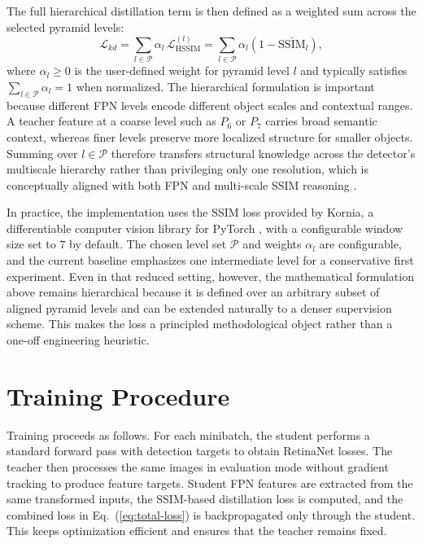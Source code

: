 The full hierarchical distillation term is then defined as a weighted sum across the selected pyramid levels:
\begin{equation}
\mathcal{L}_{kd} = \sum_{l \in \mathcal{P}} \alpha_l \, \mathcal{L}_{\mathrm{HSSIM}}^{(l)}
= \sum_{l \in \mathcal{P}} \alpha_l \left(1-\bar{\mathrm{SSIM}}_l\right),
\end{equation}
where $\alpha_l \ge 0$ is the user-defined weight for pyramid level $l$ and typically satisfies $\sum_{l \in \mathcal{P}} \alpha_l = 1$ when normalized. The hierarchical formulation is important because different FPN levels encode different object scales and contextual ranges. A teacher feature at a coarse level such as $P_6$ or $P_7$ carries broad semantic context, whereas finer levels preserve more localized structure for smaller objects. Summing over $l \in \mathcal{P}$ therefore transfers structural knowledge across the detector's multiscale hierarchy rather than privileging only one resolution, which is conceptually aligned with both FPN and multi-scale SSIM reasoning \cite{lin2017fpn,wang2003msssim,derijk2022structural}.

In practice, the implementation uses the SSIM loss provided by Kornia, a differentiable computer vision library for PyTorch \cite{riba2020kornia}, with a configurable window size set to $7$ by default. The chosen level set $\mathcal{P}$ and weights $\alpha_l$ are configurable, and the current baseline emphasizes one intermediate level for a conservative first experiment. Even in that reduced setting, however, the mathematical formulation above remains hierarchical because it is defined over an arbitrary subset of aligned pyramid levels and can be extended naturally to a denser supervision scheme. This makes the loss a principled methodological object rather than a one-off engineering heuristic.

\section{Training Procedure}

Training proceeds as follows. For each minibatch, the student performs a standard forward pass with detection targets to obtain RetinaNet losses. The teacher then processes the same images in evaluation mode without gradient tracking to produce feature targets. Student FPN features are extracted from the same transformed inputs, the SSIM-based distillation loss is computed, and the combined loss in Eq.~(\ref{eq:total-loss}) is backpropagated only through the student. This keeps optimization efficient and ensures that the teacher remains fixed.

